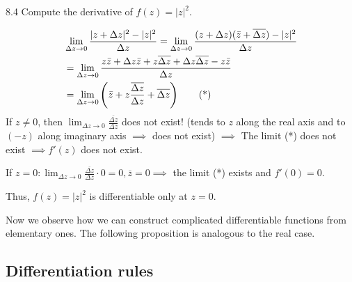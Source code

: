 \begin{example}\label{example:8.4} 8.4 Compute the derivative of $f(z) = |z|^2$.
\begin{soln}
      \begin{align}
         & \lim_{\Delta z \to 0} \frac{|z + \Delta z|^2 - |z|^2}{\Delta z} = \lim_{\Delta z \to 0} \frac{(z + \Delta z)(\bar{z} + \overline{\Delta z}) - |z|^2}{\Delta z} \notag \\ 
         & = \lim_{\Delta z \to 0} \frac{z\bar{z} + \Delta z \bar{z} + z\overline{\Delta z} + \Delta z \overline{\Delta z} - z\bar{z}}{\Delta z} \notag \\ 
         & = \lim_{\Delta z \to 0} \left(\bar{z} + z\frac{\overline{\Delta z}}{\Delta z} + \overline{\Delta z}\right) \tag{*} \label{eq:8.4}
        \end{align}
    If $z \neq 0$, then $\lim_{\Delta z \to 0} \frac{\overline{\Delta z}}{\Delta z}$ does not exist! (tends to $z$ along the real axis and to $(-z)$ along imaginary axis $\implies$ does not exist) $\implies$ The limit (*) does not exist $\implies f'(z)$ does not exist.
    
    If $z = 0: \lim_{\Delta z \to 0} \frac{\overline{\Delta z}}{\Delta z} \cdot 0 = 0, \bar{z} = 0 \implies$ the limit (*) exists and $f'(0) = 0$.
    
    Thus, $f(z) = |z|^2$ is differentiable only at $z = 0$.
\end{soln}

\end{example}

Now we observe how we can construct complicated differentiable functions from elementary ones. The following proposition is analogous to the real case.

\subsection{Differentiation rules}

